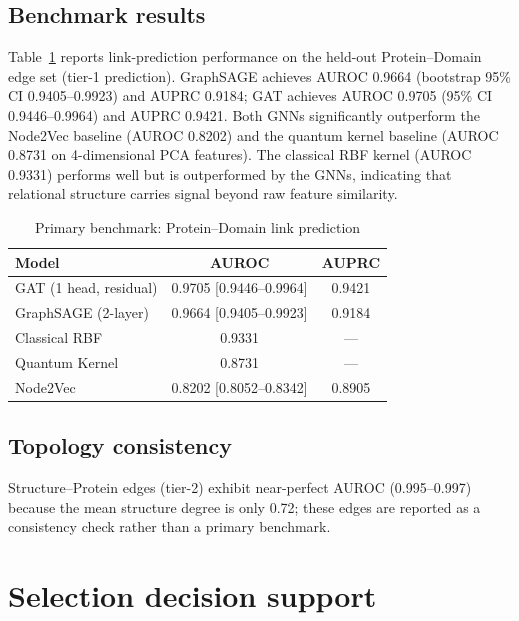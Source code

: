 \documentclass[11pt,a4paper]{article}
\begin{document}
\subsection*{Benchmark results}
Table~\ref{tab:benchmark} reports link-prediction performance on the held-out Protein--Domain edge set (tier-1 prediction). GraphSAGE achieves AUROC 0.9664 (bootstrap 95\% CI 0.9405--0.9923) and AUPRC 0.9184; GAT achieves AUROC 0.9705 (95\% CI 0.9446--0.9964) and AUPRC 0.9421. Both GNNs significantly outperform the Node2Vec baseline (AUROC 0.8202) and the quantum kernel baseline (AUROC 0.8731 on 4-dimensional PCA features). The classical RBF kernel (AUROC 0.9331) performs well but is outperformed by the GNNs, indicating that relational structure carries signal beyond raw feature similarity.

\begin{table}[ht]
\centering
\caption{Primary benchmark: Protein--Domain link prediction}
\label{tab:benchmark}
\begin{tabular}{lcc}
\toprule
Model & AUROC & AUPRC \\
\midrule
GAT (1 head, residual) & 0.9705 [0.9446--0.9964] & 0.9421 \\
GraphSAGE (2-layer) & 0.9664 [0.9405--0.9923] & 0.9184 \\
Classical RBF & 0.9331 & --- \\
Quantum Kernel & 0.8731 & --- \\
Node2Vec & 0.8202 [0.8052--0.8342] & 0.8905 \\
\bottomrule
\end{tabular}
\end{table}

\subsection*{Topology consistency}
Structure--Protein edges (tier-2) exhibit near-perfect AUROC (0.995--0.997) because the mean structure degree is only 0.72; these edges are reported as a consistency check rather than a primary benchmark.

\section*{Selection decision support}
\end{document}
